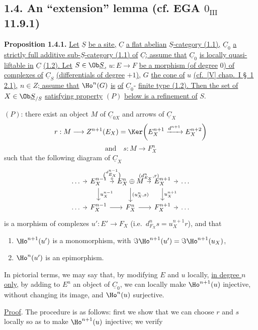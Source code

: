 \subsection*{1.4. An ``extension'' lemma (cf. EGA \(0_{\mathrm{III}}\) 11.9.1)}

\textbf{Proposition 1.4.1.} \uline{Let} \(\underline{S}\) \uline{be a site,} \(\underline{C}\) \uline{a flat abelian} \(\underline{S}\)\uline{-category (1.1),} \(\underline{C}_0\) \uline{a strictly full additive sub-}\(\underline{S}\)\uline{-category (1.1) of} \(\underline{C}\)\uline{; assume that} \(\underline{C}_0\) \uline{is locally quasi-liftable in} \(\underline{C}\) \uline{(1.2). Let} \(S\in\Ob \underline{S}\)\uline{,} \(u:E\longrightarrow F\) \uline{be a morphism (of degree} \(0\)\uline{) of complexes of} \(\underline{C}_S\) \uline{(differentials of degree} \(+1\)\uline{),} \(G\) \uline{the cone of} \(u\) \uline{(cf.\ [V] chap.\ I \S~1 2.1),} \(n\in Z\)\uline{; assume that} \(\Ho^n(G)\) \uline{is}
%
\uline{of} \(\underline{C}_0\)-%
\uline{finite type (1.2). Then the set of} \(X\in\Ob \underline{S}_{/S}\) \uline{satisfying property} \((P)\) \uline{below is a refinement of} \(S\).

\((P)\): there exist an object \(M\) of \(\underline{C}_{0X}\) and arrows of \(\underline{C}_X\)
\[
  r:M\longrightarrow Z^{n+1}(E_X)=
  \Ker\!\left(E_X^{n+1}\xrightarrow{d^{n+1}}E_X^{n+2}\right)
\]
\[
  \text{and}\quad s:M\longrightarrow F_X^n
\]
such that the following diagram of \(\underline{C}_X\)
\[
\begin{tikzcd}[column sep=tiny]
\ldots \arrow[r] & E_X^{n-1}
 \arrow[r,"{\binom{d_{E_X}^{n-1}}{0}}"]
 \arrow[d,"u_X^{n-1}"] &
E_X^n\oplus M
 \arrow[r,"{(d_{E_X}^n,r)}"]
 \arrow[d,"{(u_X^n,s)}"] &
E_X^{n+1} \arrow[r] \arrow[d,"u_X^{n+1}"] &
\ldots\\
\ldots \arrow[r] & F_X^{n-1} \arrow[r] &
F_X^n \arrow[r] &
F_X^{n+1} \arrow[r] &
\ldots
\end{tikzcd}
\]
is a morphism of complexes \(u':E'\to F_X\) (i.e.\ \(d_{F_X}^n s=u_X^{n+1}r\)), and that
\begin{enumerate}[label=(\roman*)]
\item \(\Ho^{n+1}(u')\) is a monomorphism, with \(\Im\Ho^{n+1}(u')=\Im\Ho^{n+1}(u_X)\),
\item \(\Ho^n(u')\) is an epimorphism.
\end{enumerate}

In pictorial terms, we may say that, by modifying \(E\) and \(u\) locally, \uline{in degree \(n\) only}, by adding to \(E^n\) an object of \(\underline{C}_0\), we can locally make \(\Ho^{n+1}(u)\) injective, without changing its image, and \(\Ho^n(u)\) surjective.

\uline{Proof}. The procedure is as follows: first we show that we can choose \(r\) and \(s\) locally so as to make \(\Ho^{n+1}(u)\) injective; we verify 
